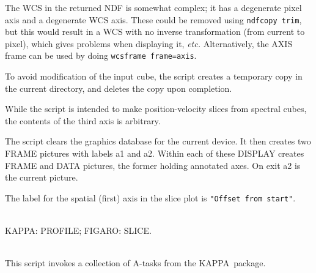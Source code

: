 \documentclass[twoside,11pt]{article}
\newcommand{\xref}[3]{#1}
\renewcommand{\_}{\texttt{\symbol{95}}}
\newcommand{\KAPPA}{{\footnotesize KAPPA}\normalsize}
\newcommand{\sstdiytopic}[2]{\item[{\hspace{-0.35em}#1\hspace{-0.35em}:}] \mbox{} \\[1.3ex] #2}
\newcommand{\sstimplementationstatus}[1]{
   \item[{Implementation Status:}] \mbox{} \\[1.3ex] #1}
\newcommand{\sstitem}{\item}
\newcommand{\sstdiytopic}[2]{\item[{#1}]
      \begin{description}
         #2
      \end{description}
   }
\newcommand{\sstimplementationstatus}[1]{\item[Implementation Status:]
      \begin{description}
         #1
      \end{description}
   }
\begin{document}
{{{         \sstitem
         The WCS in the returned NDF is somewhat complex; it has a
         degenerate pixel axis and a degenerate WCS axis. These could be
         removed using {\tt ndfcopy trim}, but this would result in a WCS
         with no inverse transformation (from current to pixel), which gives
         problems when displaying it, \emph{etc.} Alternatively, the AXIS frame
         can be used by doing {\tt wcsframe frame=axis}.

         \sstitem
         To avoid modification of the input cube, the script creates a
         temporary copy in the current directory, and deletes the copy upon
         completion.

         \sstitem
         While the script is intended to make position-velocity slices
         from spectral cubes, the contents of the third axis is arbitrary.

         \sstitem
         The script clears the graphics database for the current device.
         It then creates two FRAME pictures with labels a1 and a2.  Within each
         of these \xref{DISPLAY}{sun95}{DISPLAY} creates FRAME and DATA pictures,
         the former holding annotated axes.  On exit a2 is the current picture.

         \sstitem
         The label for the spatial (first) axis in the slice plot is
         {\tt "Offset from start"}.
      }
   }
   \sstdiytopic{
      Related Applications
   }{
      \xref{KAPPA}{sun95}{}: \xref{PROFILE}{sun95}{PROFILE};
      \xref{FIGARO}{sun86}{}: \xref{SLICE}{sun86}{SLICE}.
   }
   \sstimplementationstatus{
      This script invokes a collection of A-tasks from the \KAPPA\ package.
   }
}
\end{document}

